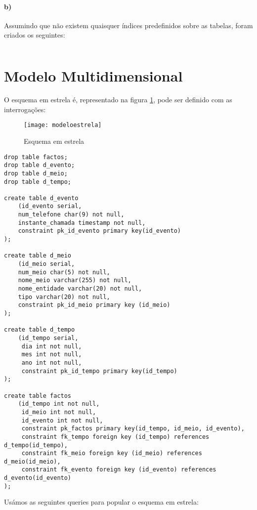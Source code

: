 \documentclass[10pt,a4paper]{article}
\begin{document}
\paragraph{b)}
Assumindo que não existem quaisquer índices predefinidos sobre as tabelas, foram criados os seguintes:

\begin{verbatim}
\end{verbatim}

\section{Modelo Multidimensional}

O esquema em estrela é, representado na figura \ref{f1}, pode ser definido com as interrogações:

\begin{figure}[h]
	\centering
	\texttt{[image: modeloestrela]}
	\caption{Esquema em estrela}
	\label{f1}
\end{figure}

\begin{verbatim}
drop table factos;
drop table d_evento;
drop table d_meio;
drop table d_tempo;

create table d_evento
    (id_evento serial,
    num_telefone char(9) not null,
    instante_chamada timestamp not null,
    constraint pk_id_evento primary key(id_evento)
);

create table d_meio
    (id_meio serial,
    num_meio char(5) not null,
    nome_meio varchar(255) not null,
    nome_entidade varchar(20) not null,
    tipo varchar(20) not null,
    constraint pk_id_meio primary key (id_meio)
);

create table d_tempo
    (id_tempo serial,
     dia int not null,
     mes int not null,
     ano int not null,
     constraint pk_id_tempo primary key(id_tempo)
);

create table factos
    (id_tempo int not null,
     id_meio int not null,
     id_evento int not null,
     constraint pk_factos primary key(id_tempo, id_meio, id_evento),
     constraint fk_tempo foreign key (id_tempo) references d_tempo(id_tempo),
     constraint fk_meio foreign key (id_meio) references d_meio(id_meio),
     constraint fk_evento foreign key (id_evento) references d_evento(id_evento)
);
\end{verbatim}

Usámos as seguintes queries para popular o esquema em estrela:
\end{document}
